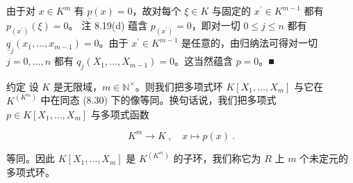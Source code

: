 \begin{remark}
\begin{items}
由于对  $ x \in K^{m} $ 有  $ \underline{p}(x) = 0 $，故对每个  $ \xi \in K $ 与固定的  $ x^{\prime} \in K^{m-1} $ 都有  $ p_{(x^{\prime})}(\xi) = 0 $。
注 8.19(d) 蕴含  $ p_{(x^{\prime})} = 0 $，即对一切  $ 0 \leq j \leq n $ 都有  $ \underline{q}_{j}(x_{1}, \ldots, x_{m-1}) = 0 $。由于  $ x^{\prime} \in K^{m-1} $ 是任意的，由归纳法可得对一切  $ j = 0, \ldots, n $ 都有  $ q_{j}(X_{1}, \ldots, X_{m-1}) = 0 $。这当然蕴含  $ p = 0 $。■

\end{items}

约定 设 $K$ 是无限域，$m \in \mathbb{N}^\times$。则我们把多项式环 $K[X_1, \ldots, X_m]$ 与它在 $K^{(K^m)}$ 中在同态 (8.30) 下的像等同。换句话说，我们把多项式 $p \in K[X_1, \ldots, X_m]$ 与多项式函数

\[
K^{m}\to K~,\quad x\mapsto p(x)~.
\]

等同。因此  $ K[X_1, \ldots, X_m] $ 是  $ K^{(K^m)} $ 的子环，我们称它为 $ R $ 上 $ m $ 个未定元的多项式环。

\end{remark}

\exerciseshead

